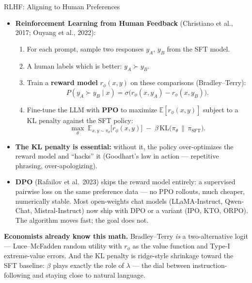 \begin{frame}{RLHF: Aligning to Human Preferences}
\begin{itemize}
\item \textbf{Reinforcement Learning from Human Feedback} (Christiano et al., 2017; Ouyang et al., 2022):
\begin{enumerate}
\item For each prompt, sample two responses $y_A$, $y_B$ from the SFT model.
\item A human labels which is better: $y_A \succ y_B$.
\item Train a \textbf{reward model} $r_\phi(x, y)$ on these comparisons (Bradley--Terry):
\[
P(y_A \succ y_B \mid x) = \sigma\bigl(r_\phi(x, y_A) - r_\phi(x, y_B)\bigr).
\]
\item Fine-tune the LLM with \textbf{PPO} to maximize $\mathbb{E}[r_\phi(x, y)]$ subject to a KL penalty against the SFT policy:
\[
\max_\theta \; \mathbb{E}_{x, y \sim \pi_\theta}\bigl[r_\phi(x, y)\bigr]
\;-\; \beta\, \mathrm{KL}\bigl(\pi_\theta \,\|\, \pi_{\text{SFT}}\bigr).
\]
\end{enumerate}

\medskip
\item \textbf{The KL penalty is essential:} without it, the policy over-optimizes the reward model and ``hacks'' it (Goodhart's law in action --- repetitive phrasing, over-apologizing).

\medskip
\item \textbf{DPO} (Rafailov et al.\ 2023) skips the reward model entirely: a supervised pairwise loss on the same preference data --- no PPO rollouts, much cheaper, numerically stable. Most open-weights chat models (LLaMA-Instruct, Qwen-Chat, Mistral-Instruct) now ship with DPO or a variant (IPO, KTO, ORPO). The algorithm moves fast; the goal does not.
\end{itemize}
\smallskip
\begin{conceptbox}
\textbf{Economists already know this math.} Bradley--Terry \emph{is} a two-alternative logit --- Luce--McFadden random utility with $r_\phi$ as the value function and Type-I extreme-value errors. And the KL penalty is ridge-style shrinkage toward the SFT baseline: $\beta$ plays exactly the role of $\lambda$ --- the dial between instruction-following and staying close to natural language.
\end{conceptbox}
\end{frame}

